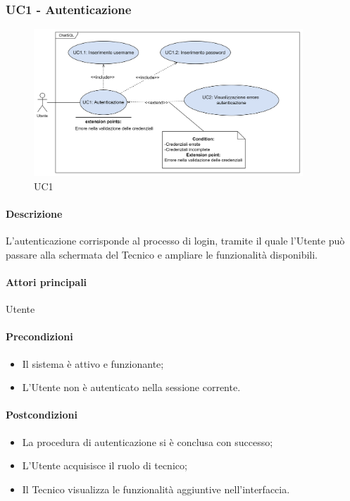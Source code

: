 \subsubsection{UC1 - Autenticazione}\label{UC1}

\begin{figure}[H]
  \centering
  \includegraphics[width=0.90\textwidth]{assets/uc1.png}
  \caption{UC1}
\end{figure}

\paragraph*{Descrizione}
L'autenticazione corrisponde al processo di login, tramite il quale l'Utente può passare alla schermata del Tecnico e ampliare le funzionalità disponibili.

\paragraph*{Attori principali}
Utente

\paragraph*{Precondizioni}
\begin{itemize}
  \item Il sistema è attivo e funzionante;
  \item L'Utente non è autenticato nella sessione corrente.
\end{itemize}

\paragraph*{Postcondizioni}
\begin{itemize}
  \item La procedura di autenticazione si è conclusa con successo;
  \item L'Utente acquisisce il ruolo di tecnico;
  \item Il Tecnico visualizza le funzionalità aggiuntive nell'interfaccia.  
\end{itemize}

